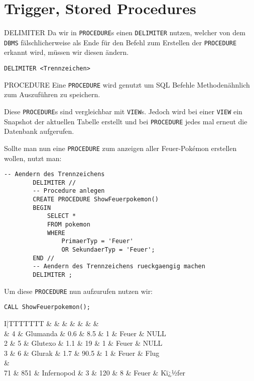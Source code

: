 \section{Trigger, Stored Procedures}

\begin{sql}{DELIMITER}
    Da wir in \texttt{PROCEDURE}s einen \texttt{DELIMITER} nutzen, welcher von dem \texttt{DBMS} fälschlicherweise als Ende für den Befehl zum Erstellen der \texttt{PROCEDURE} erkannt wird, müssen wir diesen ändern.

    \begin{lstlisting}[language=mysql]
        DELIMITER <Trennzeichen>
    \end{lstlisting}
\end{sql}

\begin{sql}{PROCEDURE}
    Eine \texttt{PROCEDURE} wird genutzt um SQL Befehle Methodenähnlich zum Auszuführen zu speichern.

    Diese \texttt{PROCEDURE}s sind vergleichbar mit \texttt{VIEW}s.
    Jedoch wird bei einer \texttt{VIEW} ein Snapshot der aktuellen Tabelle erstellt und bei \texttt{PROCEDURE} jedes mal erneut die Datenbank aufgerufen. 

    Sollte man nun eine \texttt{PROCEDURE} zum anzeigen aller Feuer-Pokémon erstellen wollen, nutzt man:

    \begin{lstlisting}[language=mysql]
        -- Aendern des Trennzeichens
        DELIMITER //
        -- Procedure anlegen
        CREATE PROCEDURE ShowFeuerpokemon()
        BEGIN
            SELECT *
            FROM pokemon
            WHERE
                PrimaerTyp = 'Feuer'
                OR SekundaerTyp = 'Feuer';
        END //
        -- Aendern des Trennzeichens rueckgaengig machen
        DELIMITER ;
    \end{lstlisting}

    Um diese \texttt{PROCEDURE} nun aufzurufen nutzen wir:

    \begin{lstlisting}[language=mysql]
        CALL ShowFeuerpokemon();
    \end{lstlisting}

    \setcounter{rownum}{0}
    \begin{tabular}{I|TTTTTTT}
        &  &  &  &  &  &  &  \\ & 4 & Glumanda & 0.6 & 8.5 & 1 & Feuer & NULL \\
        2 & 5 & Glutexo & 1.1 & 19 & 1 & Feuer & NULL \\
        3 & 6 & Glurak & 1.7 & 90.5 & 1 & Feuer & Flug \\
         &  \\
        71 & 851 & Infernopod & 3 & 120 & 8 & Feuer & Kï¿½fer \\
    \end{tabular}


\end{sql}
